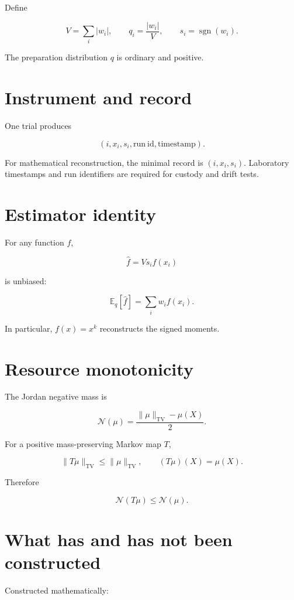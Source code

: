 \documentclass[11pt,a4paper,openany]{report}
\begin{document}
Define

\[
V=\sum_i|w_i|,
\qquad
q_i=\frac{|w_i|}{V},
\qquad
s_i=\operatorname{sgn}(w_i).
\]

The preparation distribution \(q\) is ordinary and positive.

\section{Instrument and record}

One trial produces

\[
(i,x_i,s_i,\mathrm{run\ id},\mathrm{timestamp}).
\]

For mathematical reconstruction, the minimal record is \((i,x_i,s_i)\). Laboratory timestamps and run identifiers are required for custody and drift tests.

\section{Estimator identity}

For any function \(f\),

\[
\widehat f=Vs_if(x_i)
\]

is unbiased:

\[
\mathbb E_q[\widehat f]
=
\sum_iw_if(x_i).
\]

In particular, \(f(x)=x^k\) reconstructs the signed moments.

\section{Resource monotonicity}

The Jordan negative mass is

\[
\mathcal N(\mu)
=
\frac{\|\mu\|_{\mathrm{TV}}-\mu(X)}2.
\]

For a positive mass-preserving Markov map \(T\),

\[
\|T\mu\|_{\mathrm{TV}}
\leq
\|\mu\|_{\mathrm{TV}},
\qquad
(T\mu)(X)=\mu(X).
\]

Therefore

\[
\mathcal N(T\mu)\leq\mathcal N(\mu).
\]

\section{What has and has not been constructed}

Constructed mathematically:
\end{document}
